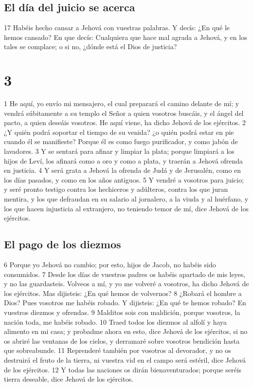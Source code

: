 \section*{El día del juicio se acerca}

17 Habéis hecho cansar a Jehová con vuestras palabras. Y decís: ¿En qué le hemos cansado? En que decís: Cualquiera que hace mal agrada a Jehová, y en los tales se complace; o si no, ¿dónde está el Dios de justicia?

\chapter{3}

1 He aquí, yo envío mi mensajero, el cual preparará el camino delante de mí; y vendrá súbitamente a su templo el Señor a quien vosotros buscáis, y el ángel del pacto, a quien deseáis vosotros. He aquí viene, ha dicho Jehová de los ejércitos.
2 ¿Y quién podrá soportar el tiempo de su venida? ¿o quién podrá estar en pie cuando él se manifieste? Porque él es como fuego purificador, y como jabón de lavadores.
3 Y se sentará para afinar y limpiar la plata; porque limpiará a los hijos de Leví, los afinará como a oro y como a plata, y traerán a Jehová ofrenda en justicia.
4 Y será grata a Jehová la ofrenda de Judá y de Jerusalén, como en los días pasados, y como en los años antiguos.
5 Y vendré a vosotros para juicio; y seré pronto testigo contra los hechiceros y adúlteros, contra los que juran mentira, y los que defraudan en su salario al jornalero, a la viuda y al huérfano, y los que hacen injusticia al extranjero, no teniendo temor de mí, dice Jehová de los ejércitos.

\section*{El pago de los diezmos}

6 Porque yo Jehová no cambio; por esto, hijos de Jacob, no habéis sido consumidos. 
7 Desde los días de vuestros padres os habéis apartado de mis leyes, y no las guardasteis. Volveos a mí, y yo me volveré a vosotros, ha dicho Jehová de los ejércitos. Mas dijisteis: ¿En qué hemos de volvernos?
8 ¿Robará el hombre a Dios? Pues vosotros me habéis robado. Y dijisteis: ¿En qué te hemos robado? En vuestros diezmos y ofrendas.
9 Malditos sois con maldición, porque vosotros, la nación toda, me habéis robado.
10 Traed todos los diezmos al alfolí y haya alimento en mi casa; y probadme ahora en esto, dice Jehová de los ejércitos, si no os abriré las ventanas de los cielos, y derramaré sobre vosotros bendición hasta que sobreabunde.
11 Reprenderé también por vosotros al devorador, y no os destruirá el fruto de la tierra, ni vuestra vid en el campo será estéril, dice Jehová de los ejércitos.
12 Y todas las naciones os dirán bienaventurados; porque seréis tierra deseable, dice Jehová de los ejércitos.

